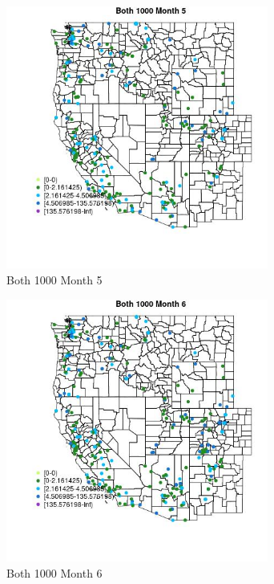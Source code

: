 \begin{figure} 
\centering  
\includegraphics[width=0.77\textwidth]{Code_Outputs/Report_ML_input_PM25_Step4_part_e_de_duplicated_aveswNAs_MapObsMo5Both_1000.jpg} 
\caption{\label{fig:Report_ML_input_PM25_Step4_part_e_de_duplicated_aveswNAsMapObsMo5Both_1000}Both 1000 Month 5} 
\end{figure} 
 

\clearpage 

\begin{figure} 
\centering  
\includegraphics[width=0.77\textwidth]{Code_Outputs/Report_ML_input_PM25_Step4_part_e_de_duplicated_aveswNAs_MapObsMo6Both_1000.jpg} 
\caption{\label{fig:Report_ML_input_PM25_Step4_part_e_de_duplicated_aveswNAsMapObsMo6Both_1000}Both 1000 Month 6} 
\end{figure} 
 

